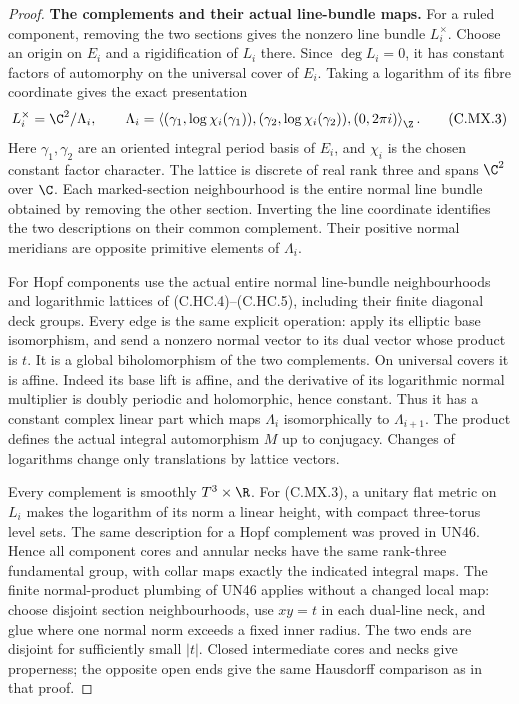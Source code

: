 \begin{proof}
\par\medskip\noindent\textbf{The complements and their actual line-bundle maps.}
For a ruled component, removing the two sections gives the
nonzero line bundle $L_i^\times$. Choose an origin on $E_i$
and a rigidification of $L_i$ there. Since $\deg L_i=0$, it
has constant factors of automorphy on the universal cover
of $E_i$. Taking a logarithm of its fibre coordinate gives
the exact presentation
\[
 L_i^\times=\C^2/\Lambda_i,\qquad
 \Lambda_i=\left\langle
       (\gamma_1,\log\chi_i(\gamma_1)),
       (\gamma_2,\log\chi_i(\gamma_2)),(0,2\pi i)
                         \right\rangle_{\Z} .             \tag{C.MX.3}
\]
Here $\gamma_1,\gamma_2$ are an oriented integral period
basis of $E_i$, and $\chi_i$ is the chosen constant
factor character. The lattice is discrete of real rank
three and spans $\C^2$ over $\C$. Each marked-section
neighbourhood is the entire normal line bundle obtained
by removing the other section. Inverting the line
coordinate identifies the two descriptions on their
common complement. Their positive normal meridians are
opposite primitive elements of $\Lambda_i$.

For Hopf components use the actual entire normal
line-bundle neighbourhoods and logarithmic lattices
of (C.HC.4)--(C.HC.5), including their finite diagonal
deck groups. Every edge is the same explicit operation:
apply its elliptic base isomorphism, and send a nonzero
normal vector to its dual vector whose product is $t$.
It is a global biholomorphism of the two complements.
On universal covers it is affine. Indeed its base lift
is affine, and the derivative of its logarithmic normal
multiplier is doubly periodic and holomorphic, hence
constant. Thus it has a constant complex linear part
which maps $\Lambda_i$ isomorphically to $\Lambda_{i+1}$.
The product defines the actual integral automorphism
$M$ up to conjugacy. Changes of logarithms change only
translations by lattice vectors.

Every complement is smoothly $T^3\times\R$.
For (C.MX.3), a unitary flat metric on $L_i$ makes
the logarithm of its norm a linear height, with compact
three-torus level sets. The same description for a
Hopf complement was proved in UN46. Hence all component
cores and annular necks have the same rank-three
fundamental group, with collar maps exactly the
indicated integral maps. The finite normal-product
plumbing of UN46 applies without a changed local map:
choose disjoint section neighbourhoods, use $xy=t$
in each dual-line neck, and glue where one normal
norm exceeds a fixed inner radius. The two ends
are disjoint for sufficiently small $|t|$.
Closed intermediate cores and necks give properness;
the opposite open ends give the same Hausdorff
comparison as in that proof.


\end{proof}
